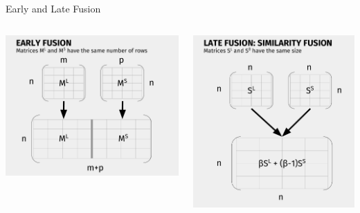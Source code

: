 \documentclass[10pt,xcolor=table]{beamer}
\begin{document}
\begin{frame}{Early and Late Fusion}
\begin{center}
\end{center}
\begin{columns}
	\begin{minipage}[c][0.5\textheight][c]{\linewidth}
		\centering
		\includegraphics[width=1\linewidth]{image2/Chapitre3/ef_diag}
		\end{minipage}
	\begin{minipage}[c][0.5\textheight][c]{\linewidth}
		\centering
		\includegraphics[width=1\linewidth]{image2/Chapitre3/lf2_diag.pdf}
	\end{minipage}
\end{columns}




\end{frame}
\end{document}
